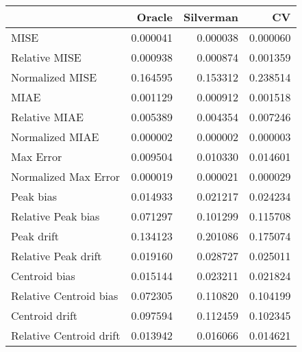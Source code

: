 \begin{tabular}{lrrr}
  \hline
 & Oracle & Silverman & CV \\ 
  \hline
MISE & 0.000041 & 0.000038 & 0.000060 \\ 
  Relative MISE & 0.000938 & 0.000874 & 0.001359 \\ 
  Normalized MISE & 0.164595 & 0.153312 & 0.238514 \\ 
  MIAE & 0.001129 & 0.000912 & 0.001518 \\ 
  Relative MIAE & 0.005389 & 0.004354 & 0.007246 \\ 
  Normalized MIAE & 0.000002 & 0.000002 & 0.000003 \\ 
  Max Error & 0.009504 & 0.010330 & 0.014601 \\ 
  Normalized Max Error & 0.000019 & 0.000021 & 0.000029 \\ 
  Peak bias & 0.014933 & 0.021217 & 0.024234 \\ 
  Relative Peak bias & 0.071297 & 0.101299 & 0.115708 \\ 
  Peak drift & 0.134123 & 0.201086 & 0.175074 \\ 
  Relative Peak drift & 0.019160 & 0.028727 & 0.025011 \\ 
  Centroid bias & 0.015144 & 0.023211 & 0.021824 \\ 
  Relative Centroid bias & 0.072305 & 0.110820 & 0.104199 \\ 
  Centroid drift & 0.097594 & 0.112459 & 0.102345 \\ 
  Relative Centroid drift & 0.013942 & 0.016066 & 0.014621 \\ 
   \hline
\end{tabular}
